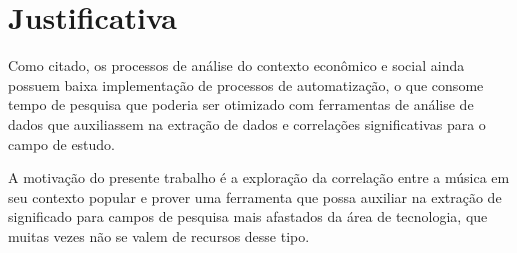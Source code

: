 \chapter{Justificativa}
\label{c.justificativa}

Como citado, os processos de análise do contexto econômico e social ainda possuem baixa implementação de processos de automatização, o que consome tempo de pesquisa que poderia ser otimizado com ferramentas de análise de dados que auxiliassem na extração de dados e correlações significativas para o campo de estudo.

A motivação do presente trabalho é a exploração da correlação entre a música em seu contexto popular e prover uma ferramenta que possa auxiliar na extração de significado para campos de pesquisa mais afastados da área de tecnologia, que muitas vezes não se valem de recursos desse tipo.
